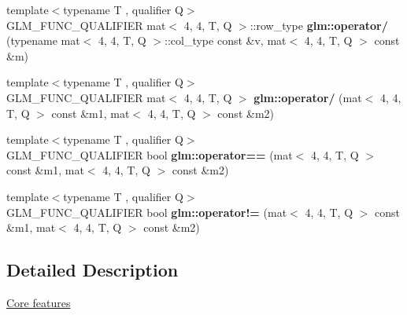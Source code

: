 \begin{DoxyCompactItemize}
\item 
\mbox{\label{type__mat4x4_8inl_ac06cdd1820160ae6b8e9f720b002df59}} 
{\footnotesize template$<$typename T , qualifier Q$>$ }\\G\+L\+M\+\_\+\+F\+U\+N\+C\+\_\+\+Q\+U\+A\+L\+I\+F\+I\+ER mat$<$ 4, 4, T, Q $>$\+::row\+\_\+type {\bfseries glm\+::operator/} (typename mat$<$ 4, 4, T, Q $>$\+::col\+\_\+type const \&v, mat$<$ 4, 4, T, Q $>$ const \&m)
\item 
\mbox{\label{type__mat4x4_8inl_acc629aef32528a5a54e77fb86460dbee}} 
{\footnotesize template$<$typename T , qualifier Q$>$ }\\G\+L\+M\+\_\+\+F\+U\+N\+C\+\_\+\+Q\+U\+A\+L\+I\+F\+I\+ER mat$<$ 4, 4, T, Q $>$ {\bfseries glm\+::operator/} (mat$<$ 4, 4, T, Q $>$ const \&m1, mat$<$ 4, 4, T, Q $>$ const \&m2)
\item 
\mbox{\label{type__mat4x4_8inl_a8bcfe7feeeb780a7ea48046ae4c6cd57}} 
{\footnotesize template$<$typename T , qualifier Q$>$ }\\G\+L\+M\+\_\+\+F\+U\+N\+C\+\_\+\+Q\+U\+A\+L\+I\+F\+I\+ER bool {\bfseries glm\+::operator==} (mat$<$ 4, 4, T, Q $>$ const \&m1, mat$<$ 4, 4, T, Q $>$ const \&m2)
\item 
\mbox{\label{type__mat4x4_8inl_ae03f4496a0725bb705dbfccd4daebae1}} 
{\footnotesize template$<$typename T , qualifier Q$>$ }\\G\+L\+M\+\_\+\+F\+U\+N\+C\+\_\+\+Q\+U\+A\+L\+I\+F\+I\+ER bool {\bfseries glm\+::operator!=} (mat$<$ 4, 4, T, Q $>$ const \&m1, mat$<$ 4, 4, T, Q $>$ const \&m2)
\end{DoxyCompactItemize}


\subsection{Detailed Description}
\hyperlink{group__core}{Core features} 